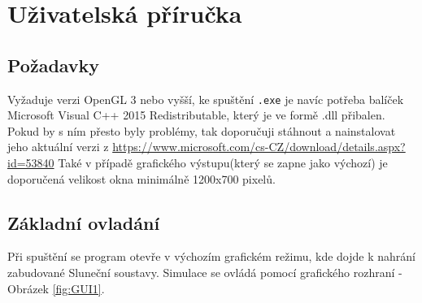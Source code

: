 \chapter{Uživatelská příručka}
\label{chap:userGuide}
\section{Požadavky}
Vyžaduje verzi OpenGL 3 nebo vyšší, ke spuštění \texttt{.exe}  je navíc potřeba balíček Microsoft Visual C++ 2015 Redistributable, který je ve formě .dll přibalen. Pokud by s ním přesto byly problémy, tak doporučuji stáhnout  a nainstalovat jeho aktuální verzi z \url{https://www.microsoft.com/cs-CZ/download/details.aspx?id=53840}
Také v případě grafického výstupu(který se zapne jako výchozí) je doporučená velikost okna minimálně 1200x700 pixelů.
\section{Základní ovladání}
Při spuštění se program otevře v výchozím grafickém režimu, kde dojde k nahrání zabudované Sluneční soustavy. Simulace se ovládá pomocí grafického rozhraní - Obrázek \ref{fig:GUI1}.\\
